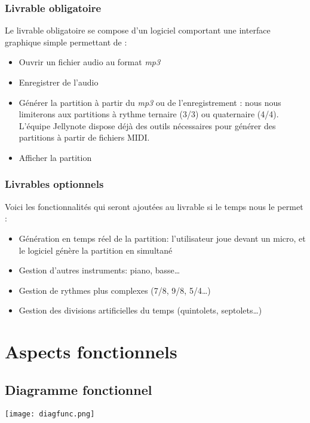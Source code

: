 \documentclass[12pt]{article}
\begin{document}
\subsubsection{Livrable obligatoire}

Le livrable obligatoire se compose d’un logiciel comportant une interface graphique simple permettant de :\\
\begin{itemize}
\item Ouvrir un fichier audio au format \emph{mp3}
\item Enregistrer de l’audio
\item Générer la partition à partir du \emph{mp3} ou de l’enregistrement : nous nous limiterons aux partitions à rythme ternaire (3/3) ou quaternaire (4/4).\\
L’équipe Jellynote dispose déjà des outils nécessaires pour générer des partitions à partir de fichiers MIDI.
\item Afficher la partition
\end{itemize}

\subsubsection{Livrables optionnels}

Voici les fonctionnalités qui seront ajoutées au livrable si le temps nous le permet :
\begin{itemize}
\item Génération en temps réel de la partition: l’utilisateur joue devant un micro, et le logiciel génère la partition en simultané
\item Gestion d’autres instruments: piano, basse…
\item Gestion de rythmes plus complexes (7/8, 9/8, 5/4…)
\item Gestion des divisions artificielles du temps (quintolets, septolets…)
\end{itemize}

\newpage
\section{Aspects fonctionnels}

\subsection{Diagramme fonctionnel}
\vspace{1cm}
\texttt{[image: diagfunc.png]}
\end{document}

